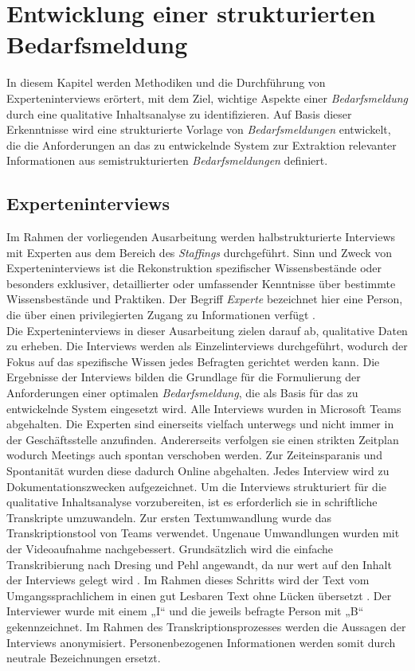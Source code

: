 \chapter{Entwicklung einer strukturierten Bedarfsmeldung}
\label{chap:erwartungshaltung}
In diesem Kapitel werden Methodiken und die Durchführung von Experteninterviews erörtert, mit dem Ziel, wichtige Aspekte einer \emph{Bedarfsmeldung} durch eine qualitative Inhaltsanalyse zu identifizieren. Auf Basis dieser Erkenntnisse wird eine strukturierte Vorlage von \emph{Bedarfsmeldungen} entwickelt, die die Anforderungen an das zu entwickelnde System zur Extraktion relevanter Informationen aus semistrukturierten \emph{Bedarfsmeldungen} definiert.
\section{Experteninterviews}
\label{sec:beschreibung-der-interviews}
Im Rahmen der vorliegenden Ausarbeitung werden halbstrukturierte Interviews mit Experten aus dem Bereich des \emph{Staffings} durchgeführt. Sinn und Zweck von Experteninterviews ist die Rekonstruktion spezifischer Wissensbestände oder besonders exklusiver, detaillierter oder umfassender Kenntnisse über bestimmte Wissensbestände und Praktiken. Der Begriff \emph{Experte} bezeichnet hier eine Person, die über einen privilegierten Zugang zu Informationen verfügt \cite{pfadenhauer2009eye}.\\ 

Die Experteninterviews in dieser Ausarbeitung zielen darauf ab, qualitative Daten zu erheben. Die Interviews werden als Einzelinterviews durchgeführt, wodurch der Fokus auf das spezifische Wissen jedes Befragten gerichtet werden kann. Die Ergebnisse der Interviews bilden die Grundlage für die Formulierung der Anforderungen einer optimalen \emph{Bedarfsmeldung}, die als Basis für das zu entwickelnde System eingesetzt wird. Alle Interviews wurden in Microsoft Teams abgehalten. Die Experten sind einerseits vielfach unterwegs und nicht immer in der Geschäftsstelle anzufinden. Andererseits verfolgen sie einen strikten Zeitplan wodurch Meetings auch spontan verschoben werden. Zur Zeiteinsparanis und Spontanität wurden diese dadurch Online abgehalten. Jedes Interview wird zu Dokumentationszwecken aufgezeichnet. Um die Interviews strukturiert für die qualitative Inhaltsanalyse vorzubereiten, ist es erforderlich sie in schriftliche Transkripte umzuwandeln. Zur ersten Textumwandlung wurde das Transkriptionstool von Teams verwendet. Ungenaue Umwandlungen wurden mit der Videoaufnahme nachgebessert. Grundsätzlich wird die einfache Transkribierung nach Dresing und Pehl angewandt, da nur wert auf den Inhalt der Interviews gelegt wird \cite{dresing2015praxisbuch}. Im Rahmen dieses Schritts wird der Text vom Umgangssprachlichem in einen gut Lesbaren Text ohne Lücken übersetzt \cite{dresing2015praxisbuch}. Der Interviewer wurde mit einem „I“ und die jeweils befragte Person mit „B“ gekennzeichnet. Im Rahmen des Transkriptionsprozesses werden die Aussagen der Interviews anonymisiert. Personenbezogenen Informationen werden somit durch neutrale Bezeichnungen ersetzt.\\

